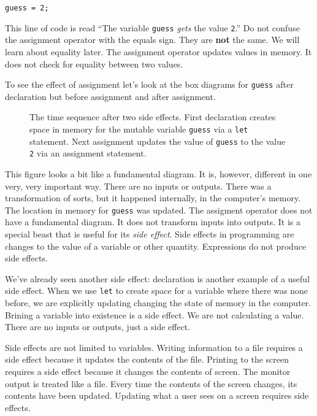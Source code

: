 \begin{lstlisting}
guess = 2;
\end{lstlisting}

This line of code is read ``The variable \texttt{guess} \emph{gets} the value \texttt{2}.''  Do not confuse the assignment operator with the equals sign. They are \textbf{not} the same. We will learn about equality later. The assignment operator updates values in memory. It does not check for equality between two values.

To see the effect of assignment let's look at the box diagrams for \texttt{guess} after declaration but before assignment and after assignment.

\begin{figure}
  
  \caption{\label{fig:intro-variable-assignment} The time sequence after two side effects. First declaration creates space in memory for the mutable variable \texttt{guess} via a \texttt{let} statement. Next assignment updates the value of \texttt{guess} to the value \texttt{2} via an assignment statement.}
\end{figure}

This figure looks a bit like a fundamental diagram. It is, however, different in one very, very important way. There are no inputs or outputs. There was a transformation of sorts, but it happened internally, in the computer's memory. The location in memory for \texttt{guess} was updated. The assigment operator does not have a fundamental diagram. It does not transform inputs into outputs. It is a special beast that is useful for its \emph{side effect}. Side effects in programming are changes to the value of a variable or other quantity. Expressions do not produce side effects.

We've already seen another side effect: declaration is another example of a useful side effect. When we use \texttt{let} to create space for a variable where there was none before, we are explicitly updating changing the state of memory in the computer. Brining a variable into existence is a side effect. We are not calculating a value. There are no inputs or outputs, just a side effect.

Side effects are not limited to variables. Writing information to a file requires a side effect because it updates the contents of the file. Printing to the screen requires a side effect because it changes the contents of screen. The monitor output is treated like a file. Every time the contents of the screen changes, its contents have been updated. Updating what a user sees on a screen requires side effects.

